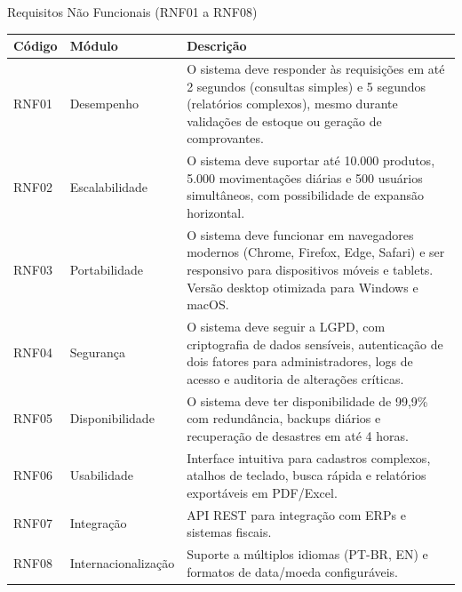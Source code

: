 \documentclass[
	12pt,				%
	openright,			%
	twoside,			%
	a4paper,			%
	english,			%
	french,				%
	spanish,			%
	brazil				%
	]{abntex2}
\begin{document}
\begin{quadro}[htb]
\caption{\label{quadro_rnf}Requisitos Não Funcionais (RNF01 a RNF08)}
\begin{tabular}{|p{1.2cm}|p{3.5cm}|p{11.0cm}|}
    \hline
    \textbf{Código} & \textbf{Módulo} & \textbf{Descrição} \\ \hline

    RNF01 & Desempenho & O sistema deve responder às requisições em até 2 segundos (consultas simples) e 5 segundos (relatórios complexos), mesmo durante validações de estoque ou geração de comprovantes. \\ \hline

    RNF02 & Escalabilidade & O sistema deve suportar até 10.000 produtos, 5.000 movimentações diárias e 500 usuários simultâneos, com possibilidade de expansão horizontal. \\ \hline

    RNF03 & Portabilidade & O sistema deve funcionar em navegadores modernos (Chrome, Firefox, Edge, Safari) e ser responsivo para dispositivos móveis e tablets. Versão desktop otimizada para Windows e macOS. \\ \hline

    RNF04 & Segurança & O sistema deve seguir a LGPD, com criptografia de dados sensíveis, autenticação de dois fatores para administradores, logs de acesso e auditoria de alterações críticas. \\ \hline

    RNF05 & Disponibilidade & O sistema deve ter disponibilidade de 99,9\% com redundância, backups diários e recuperação de desastres em até 4 horas. \\ \hline

    RNF06 & Usabilidade & Interface intuitiva para cadastros complexos, atalhos de teclado, busca rápida e relatórios exportáveis em PDF/Excel. \\ \hline

    RNF07 & Integração & API REST para integração com ERPs e sistemas fiscais. \\ \hline

    RNF08 & Internacionalização & Suporte a múltiplos idiomas (PT-BR, EN) e formatos de data/moeda configuráveis. \\ \hline

\end{tabular}
\end{quadro}

\FloatBarrier
\end{document}
